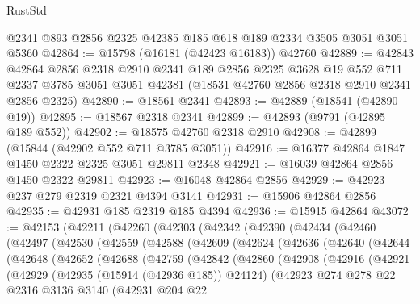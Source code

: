 \begin{lexlean}{RustStd}
\begin{coremodule}
    @2341
    @893
    @2856
    @2325
    @42385
    @185
    @618
    @189
    @2334
    @3505
    @3051
    @3051
    @5360
@42864 := @15798 (@16181 (@42423 @16183)) @42760
@42889 := @42843
    @42864
    @2856
    @2318
    @2910
    @2341
    @189
    @2856
    @2325
    @3628
    @19
    @552
    @711
    @2337
    @3785
    @3051
    @3051
    @42381
    (@18531 @42760 @2856 @2318 @2910 @2341 @2856 @2325)
@42890 := @18561 @2341
@42893 := @42889 (@18541 (@42890 @19))
@42895 := @18567 @2318 @2341
@42899 := @42893 (@9791 (@42895 @189 @552))
@42902 := @18575 @42760 @2318 @2910
@42908 := @42899 (@15844 (@42902 @552 @711 @3785 @3051))
@42916 := @16377 @42864 @1847 @1450 @2322 @2325 @3051 @29811 @2348
@42921 := @16039 @42864 @2856 @1450 @2322 @29811
@42923 := @16048 @42864 @2856
@42929 := @42923 @237 @279 @2319 @2321 @4394 @3141
@42931 := @15906 @42864 @2856
@42935 := @42931 @185 @2319 @185 @4394
@42936 := @15915 @42864
@43072 := @42153
    (@42211
      (@42260
        (@42303
          (@42342
            (@42390
              (@42434
                (@42460
                  (@42497
                    (@42530
                      (@42559
                        (@42588
                          (@42609
                            (@42624
                              (@42636
                                (@42640
                                  (@42644
                                    (@42648
                                      (@42652
                                        (@42688
                                          (@42759
                                            (@42842
                                              (@42860
                                                (@42908
                                                  (@42916
                                                    (@42921
                                                      (@42929
                                                        (@42935 (@15914 (@42936 @185)) @24124)
                                                        (@42923
                                                          @274
                                                          @278
                                                          @22
                                                          @2316
                                                          @3136
                                                          @3140
                                                          (@42931
                                                            @204
                                                            @22

\end{coremodule}
\end{lexlean}

